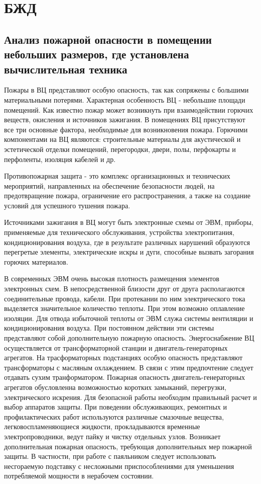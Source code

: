 \section{БЖД}

\subsection{Анализ пожарной опасности в помещении небольших размеров, где установлена вычислительная техника}

Пожары в ВЦ представляют особую опасность, так как сопряжены с большими материальными потерями.
Характерная особенность ВЦ - небольшие площади помещений. Как известно пожар может возникнуть при взаимодействии
горючих веществ, окисления и источников зажигания. В помещениях ВЦ присутствуют все три основные фактора,
необходимые для возникновения пожара. Горючими компонентами на ВЦ являются: строительные материалы для
акустической и эстетической отделки помещений, перегородки, двери, полы, перфокарты и перфоленты, изоляция кабелей и др.

Противопожарная защита - это комплекс организационных и технических мероприятий, направленных на обеспечение безопасности людей, на предотвращение пожара, ограничение его распространения, а также на создание условий для успешного тушения пожара.

Источниками зажигания в ВЦ могут быть электронные схемы от ЭВМ, приборы, применяемые для технического обслуживания, устройства электропитания, кондиционирования воздуха, где в результате различных нарушений образуются перегретые элементы, электрические искры и дуги, способные вызвать загорания горючих материалов.

В современных ЭВМ очень высокая плотность размещения элементов электронных схем. В непосредственной близости
друг от друга располагаются соединительные провода, кабели. При протекании по ним электрического тока выделяется
значительное количество теплоты. При этом возможно оплавление изоляции. Для отвода избыточной теплоты от ЭВМ служа
системы вентиляции и кондиционирования воздуха. При постоянном действии эти системы представляют собой дополнительную
пожарную опасность. Энергоснабжение ВЦ осуществляется от трансформаторной станции и двигатель-генераторных агрегатов.
На трасформаторных подстанциях особую опасность представляют трансформаторы с масляным охлаждением. В связи с этим
предпочтение следует отдавать сухим транформатором. Пожарная опасность двигатель-генераторных агрегатов обусловленна
возможностью коротких замыканий, перегрузки, электрического искрения. Для безопасной работы необходим правильный
расчет и выбор аппаратов защиты. При поведении обслуживающих, ремонтных и профилактических работ используются
различные смазочные вещества, легковоспламеняющиеся жидкости, прокладываются временные электропроводники, ведут пайку
и чистку отдельных узлов. Возникает дополнительная пожарная опасность, требующая дополнительных мер пожарной защиты.
В частности, при работе с паяльником следует использовать несгораемую подставку с несложными приспособлениями
для уменьшения потребляемой мощности в нерабочем состоянии.

